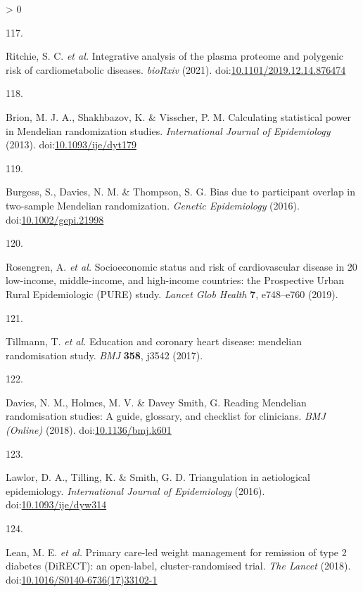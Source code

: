 \documentclass[11pt,twoside]{bristolthesis}
\newlength{\cslhangindent}
\newlength{\csllabelwidth}
\newenvironment{CSLReferences}[2] %
 {%
  \setlength{\parindent}{0pt}
  \ifodd #1 \everypar{\setlength{\hangindent}{\cslhangindent}}\ignorespaces\fi
  \ifnum #2 > 0
  \setlength{\parskip}{#2\baselineskip}
  \fi
 }%
 {}
\newcommand{\CSLLeftMargin}[1]{\parbox[t]{\csllabelwidth}{#1}}
\newcommand{\CSLRightInline}[1]{\parbox[t]{\linewidth - \csllabelwidth}{#1}\break}
\begin{document}
\begin{CSLReferences}{0}{0}
\leavevmode\hypertarget{ref-Ritchie2019}{}%
\CSLLeftMargin{117. }
\CSLRightInline{Ritchie, S. C. \emph{et al.} {Integrative analysis of the plasma proteome and polygenic risk of cardiometabolic diseases}. \emph{bioRxiv} (2021). doi:\href{https://doi.org/10.1101/2019.12.14.876474}{10.1101/2019.12.14.876474}}

\leavevmode\hypertarget{ref-Brion2013}{}%
\CSLLeftMargin{118. }
\CSLRightInline{Brion, M. J. A., Shakhbazov, K. \& Visscher, P. M. {Calculating statistical power in Mendelian randomization studies}. \emph{International Journal of Epidemiology} (2013). doi:\href{https://doi.org/10.1093/ije/dyt179}{10.1093/ije/dyt179}}

\leavevmode\hypertarget{ref-Burgess2016}{}%
\CSLLeftMargin{119. }
\CSLRightInline{Burgess, S., Davies, N. M. \& Thompson, S. G. {Bias due to participant overlap in two-sample Mendelian randomization}. \emph{Genetic Epidemiology} (2016). doi:\href{https://doi.org/10.1002/gepi.21998}{10.1002/gepi.21998}}

\leavevmode\hypertarget{ref-Rosengren2019}{}%
\CSLLeftMargin{120. }
\CSLRightInline{Rosengren, A. \emph{et al.} {Socioeconomic status and risk of cardiovascular disease in 20 low-income, middle-income, and high-income countries: the Prospective Urban Rural Epidemiologic (PURE) study}. \emph{Lancet Glob Health} \textbf{7}, e748--e760 (2019).}

\leavevmode\hypertarget{ref-Tillmann2017}{}%
\CSLLeftMargin{121. }
\CSLRightInline{Tillmann, T. \emph{et al.} {Education and coronary heart disease: mendelian randomisation study}. \emph{BMJ} \textbf{358}, j3542 (2017).}

\leavevmode\hypertarget{ref-Davies2018}{}%
\CSLLeftMargin{122. }
\CSLRightInline{Davies, N. M., Holmes, M. V. \& Davey Smith, G. {Reading Mendelian randomisation studies: A guide, glossary, and checklist for clinicians}. \emph{BMJ (Online)} (2018). doi:\href{https://doi.org/10.1136/bmj.k601}{10.1136/bmj.k601}}

\leavevmode\hypertarget{ref-Lawlor2016}{}%
\CSLLeftMargin{123. }
\CSLRightInline{Lawlor, D. A., Tilling, K. \& Smith, G. D. {Triangulation in aetiological epidemiology}. \emph{International Journal of Epidemiology} (2016). doi:\href{https://doi.org/10.1093/ije/dyw314}{10.1093/ije/dyw314}}

\leavevmode\hypertarget{ref-Lean2018}{}%
\CSLLeftMargin{124. }
\CSLRightInline{Lean, M. E. \emph{et al.} {Primary care-led weight management for remission of type 2 diabetes (DiRECT): an open-label, cluster-randomised trial}. \emph{The Lancet} (2018). doi:\href{https://doi.org/10.1016/S0140-6736(17)33102-1}{10.1016/S0140-6736(17)33102-1}}


\end{CSLReferences}
\end{document}
